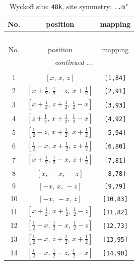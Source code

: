 \documentclass[fleqn,8pt]{jsarticle}
\begin{document}
\begin{longtable}{ccc}
\caption{Wyckoff site: {\tt 48k}, site symmetry: {\tt ..m'}}
 \\
 \hline \hline
No. & position & mapping \\ \hline \endfirsthead

\multicolumn{2}{l}{\tablename\ \thetable{}} \\
 \hline \hline
No. & position & mapping \\ \hline \endhead

 \hline \hline
\multicolumn{2}{r}{\footnotesize\it continued ...} \\ \endfoot

 \hline \hline
\multicolumn{2}{r}{} \\ \endlastfoot

1 & $\left[ x,\, x,\, z \right]$ & {\tt [1,84]} \\ \hline
2 & $\left[ x + \frac{1}{2},\, \frac{1}{2} - z,\, x + \frac{1}{2} \right]$ & {\tt [2,91]} \\ \hline
3 & $\left[ x + \frac{1}{2},\, z + \frac{1}{2},\, \frac{1}{2} - x \right]$ & {\tt [3,93]} \\ \hline
4 & $\left[ z + \frac{1}{2},\, x + \frac{1}{2},\, \frac{1}{2} - x \right]$ & {\tt [4,92]} \\ \hline
5 & $\left[ \frac{1}{2} - z,\, x + \frac{1}{2},\, x + \frac{1}{2} \right]$ & {\tt [5,94]} \\ \hline
6 & $\left[ \frac{1}{2} - x,\, x + \frac{1}{2},\, z + \frac{1}{2} \right]$ & {\tt [6,80]} \\ \hline
7 & $\left[ x + \frac{1}{2},\, \frac{1}{2} - x,\, z + \frac{1}{2} \right]$ & {\tt [7,81]} \\ \hline
8 & $\left[ x,\, - x,\, - z \right]$ & {\tt [8,78]} \\ \hline
9 & $\left[ - x,\, x,\, - z \right]$ & {\tt [9,79]} \\ \hline
10 & $\left[ - x,\, - x,\, z \right]$ & {\tt [10,83]} \\ \hline
11 & $\left[ x + \frac{1}{2},\, x + \frac{1}{2},\, \frac{1}{2} - z \right]$ & {\tt [11,82]} \\ \hline
12 & $\left[ \frac{1}{2} - x,\, \frac{1}{2} - x,\, \frac{1}{2} - z \right]$ & {\tt [12,73]} \\ \hline
13 & $\left[ \frac{1}{2} - x,\, z + \frac{1}{2},\, x + \frac{1}{2} \right]$ & {\tt [13,95]} \\ \hline
14 & $\left[ \frac{1}{2} - x,\, \frac{1}{2} - z,\, \frac{1}{2} - x \right]$ & {\tt [14,90]} \\ \hline

\end{longtable}
\end{document}
